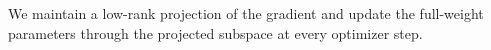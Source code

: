 We maintain a low-rank projection of the gradient and update the full-weight
parameters through the projected subspace at every optimizer step.
